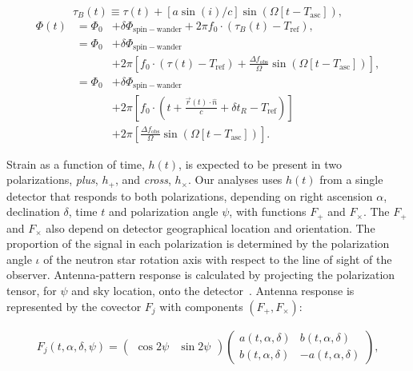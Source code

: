 \begin{equation}
\tau_B(t) \equiv \tau(t) + [a \sin(i)/c] \sin (\Omega [t - T_\mathrm{asc}]),
\label{resampled_time}
\end{equation}
\begin{eqnarray}
\Phi(t) 
    &= \Phi_0 &+ \delta \Phi_\mathrm{spin-wander} + 2\pi f_0 \cdot \left(\tau_B(t) - T_\mathrm{ref}\right), \label{compact_phase_model} \\
    &= \Phi_0 &+ \delta \Phi_\mathrm{spin-wander} \nonumber\\
    & &+ 2\pi \left[f_0 \cdot \left(\tau(t)-T_\mathrm{ref}\right) + \frac{\Delta f_\mathrm{obs}}{\Omega} \sin (\Omega [t - T_\mathrm{asc}]) \right], \\
    &= \Phi_0 &+ \delta \Phi_\mathrm{spin-wander} \nonumber\\
    & &+2\pi \left[f_0 \cdot \left(t + \frac{\vec{r}(t)\cdot \hat{n}}{c}+\delta t_R-T_\mathrm{ref}\right)\right] \nonumber\\
    & &+2\pi \left[ \frac{\Delta f_\mathrm{obs}}{\Omega} \sin (\Omega [t - T_\mathrm{asc}]) \right].
\label{phase_model}
\end{eqnarray}


Strain as a function of time, $h(t)$, is expected to be present in two polarizations, \textit{plus}, $h_+$, and \textit{cross}, $h_\times$.
Our analyses uses $h(t)$ from a single detector that responds to both polarizations, depending on right ascension $\alpha$, declination $\delta$, time $t$ and polarization angle $\psi$, with functions $F_+$ and $F_\times$.
The $F_+$ and $F_\times$ also depend on detector geographical location and orientation.
The proportion of the signal in each polarization is determined by the polarization angle $\iota$ of the neutron star rotation axis with respect to the line of sight of the observer.
Antenna-pattern response is calculated by projecting the polarization tensor, for $\psi$ and sky location, onto the detector~\cite{YunesSiemens2013}.
Antenna response is represented by the covector $F_j$ with components $(F_+, F_\times)$:

\begin{eqnarray}
F_j(t,\alpha,\delta,\psi) 
=
\left( \begin{array}{rr} \cos 2 \psi & \sin 2 \psi \end{array} \right) \left( \begin{array}{cc} a(t, \alpha, \delta) & b(t, \alpha, \delta) \\ b(t, \alpha, \delta) & -a(t, \alpha, \delta) \end{array}\right)   ,
\end{eqnarray}


